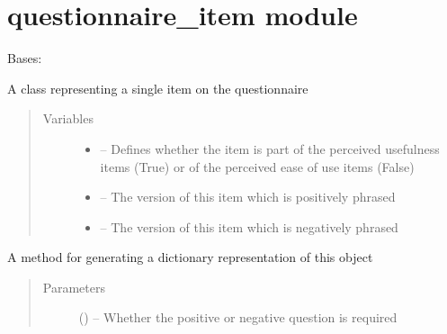 \documentclass[letterpaper,10pt,english]{sphinxmanual}
\begin{document}
\section{questionnaire\_item module}
\label{\detokenize{questionnaire_item::doc}}\label{\detokenize{questionnaire_item:module-questionnaire_item}}\label{\detokenize{questionnaire_item:questionnaire-item-module}}

\begin{fulllineitems}
\label{\detokenize{questionnaire_item:questionnaire_item.QuestionnaireItem}}
Bases: 

A class representing a single item on the questionnaire
\begin{quote}\begin{description}
\item[{Variables}] \leavevmode\begin{itemize}
\item {} 
 -- Defines whether the item is part of the perceived usefulness items (True) or of the perceived ease of use items (False)

\item {} 
 -- The version of this item which is positively phrased

\item {} 
 -- The version of this item which is negatively phrased

\end{itemize}

\end{description}\end{quote}

\begin{fulllineitems}
\label{\detokenize{questionnaire_item:questionnaire_item.QuestionnaireItem.to_dict}}
A method for generating a dictionary representation of this object
\begin{quote}\begin{description}
\item[{Parameters}] \leavevmode
{} (\href{https://docs.python.org/2/library/functions.html\#bool}{}) -- Whether the positive or negative question is required


\end{description}
\end{quote}
\end{fulllineitems}
\end{fulllineitems}
\end{document}
